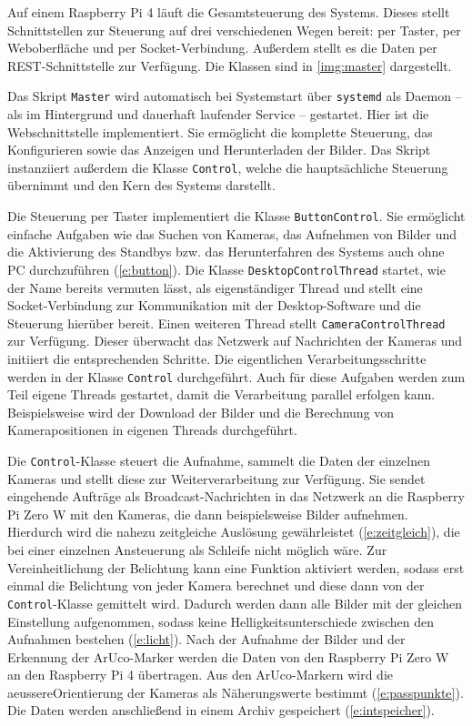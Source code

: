 \documentclass[./00PhotoBox.tex]{subfiles}
\begin{document}
Auf einem Raspberry Pi 4 läuft die Gesamt\-steuerung des Systems. Dieses stellt Schnitt\-stellen zur Steuerung auf drei verschiedenen Wegen bereit: per Taster, per Weboberfläche und per \Gls{Socket}-Verbindung. Außerdem stellt es die Daten per \Gls{REST}-Schnittstelle zur Verfügung. Die Klassen sind in \autoref{img:master} dargestellt.

Das Skript \texttt{Master} wird au\-to\-ma\-tisch bei Systemstart über \texttt{systemd} als Daemon -- als im Hintergrund und dauerhaft laufender Service \citep[vgl.][S. 369]{negus2020linux} -- gestartet. Hier ist die Webschnittstelle implementiert. Sie ermöglicht die komplette Steuerung, das Konfigurieren sowie das Anzeigen und Herunterladen der Bilder. Das Skript instanziiert außerdem die Klasse \texttt{Control}, welche die hauptsächliche Steuerung übernimmt und den Kern des Systems darstellt.

Die Steuerung per Taster implementiert die Klasse \texttt{ButtonControl}. Sie ermöglicht einfache Aufgaben wie das Suchen von Kameras, das Aufnehmen von Bilder und die Aktivierung des Standbys bzw. das Herunterfahren des Systems auch ohne PC durchzuführen (\autoref{e:button}). Die Klasse \texttt{DesktopControlThread} startet, wie der Name bereits vermuten lässt, als eigenständiger Thread und stellt eine \Gls{Socket}-Verbindung zur Kommunikation mit der Desktop-Software und die Steuerung hierüber bereit. Einen weiteren Thread stellt \texttt{CameraControlThread} zur Verfügung. Dieser überwacht das Netzwerk auf Nachrichten der Kameras und initiiert die entsprechenden Schritte. Die eigentlichen Verarbeitungsschritte werden in der Klasse \texttt{Control} durchgeführt. Auch für diese Aufgaben werden zum Teil eigene Threads gestartet, damit die Verarbeitung parallel erfolgen kann. Beispielsweise wird der Download der Bilder und die Berechnung von Kamerapositionen in eigenen Threads durchgeführt.

Die \texttt{Control}-Klasse steuert die Aufnahme, sammelt die Daten der einzelnen Kameras und stellt diese zur Weiterverarbeitung zur Verfügung. Sie sendet eingehende Aufträge als Broadcast-Nachrichten in das Netzwerk an die Raspberry Pi Zero W mit den Kameras, die dann beispielsweise Bilder aufnehmen. Hierdurch wird die nahezu zeitgleiche Auslösung gewährleistet (\autoref{e:zeitgleich}), die bei einer einzelnen Ansteuerung als Schleife nicht möglich wäre. Zur Vereinheitlichung der Belichtung kann eine Funktion aktiviert werden, sodass erst einmal die Belichtung von jeder Kamera berechnet und diese dann von der \texttt{Control}-Klasse gemittelt wird. Dadurch werden dann alle Bilder mit der gleichen Einstellung aufgenommen, sodass keine Helligkeitsunterschiede zwischen den Aufnahmen bestehen (\autoref{e:licht}).
Nach der Aufnahme der Bilder und der Erkennung der ArUco-Marker werden die Daten von den Raspberry Pi Zero W an den Raspberry Pi 4 übertragen. Aus den ArUco-Markern wird die \gls{aeussereOrientierung} der Kameras als Näherungswerte bestimmt (\autoref{e:passpunkte}). Die Daten werden anschließend in einem Archiv gespeichert (\autoref{e:intspeicher}).
\end{document}
